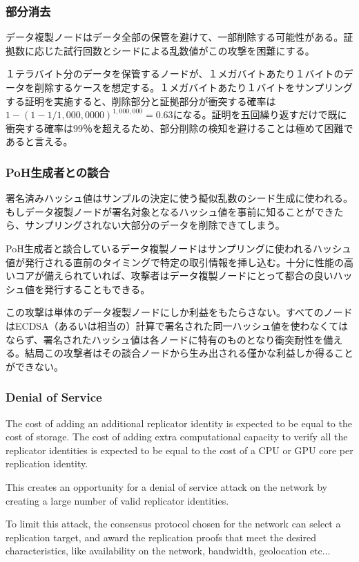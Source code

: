 \documentclass[12pt]{ltjsarticle}
\begin{document}
\subsubsection{部分消去}

データ複製ノードはデータ全部の保管を避けて、一部削除する可能性がある。証拠数に応じた試行回数とシードによる乱数値がこの攻撃を困難にする。

１テラバイト分のデータを保管するノードが、１メガバイトあたり１バイトのデータを削除するケースを想定する。１メガバイトあたり１バイトをサンプリングする証明を実施すると、削除部分と証拠部分が衝突する確率は\(1 - (1- 1/1,000,0000)^{1,000,000} = 0.63\)になる。証明を五回繰り返すだけで既に衝突する確率は99％を超えるため、部分削除の検知を避けることは極めて困難であると言える。

\subsubsection{PoH生成者との談合}

署名済みハッシュ値はサンプルの決定に使う擬似乱数のシード生成に使われる。もしデータ複製ノードが署名対象となるハッシュ値を事前に知ることができたら、サンプリングされない大部分のデータを削除できてしまう。

PoH生成者と談合しているデータ複製ノードはサンプリングに使われるハッシュ値が発行される直前のタイミングで特定の取引情報を挿し込む。十分に性能の高いコアが備えられていれば、攻撃者はデータ複製ノードにとって都合の良いハッシュ値を発行することもできる。

この攻撃は単体のデータ複製ノードにしか利益をもたらさない。すべてのノードはECDSA（あるいは相当の）計算で署名された同一ハッシュ値を使わなくてはならず、署名されたハッシュ値は各ノードに特有のものとなり衝突耐性を備える。結局この攻撃者はその談合ノードから生み出される僅かな利益しか得ることができない。

\subsubsection{Denial of Service}
The cost of adding an additional replicator identity is expected to be equal to the cost of storage. The cost of adding extra computational capacity to verify all the replicator identities is expected to be equal to the cost of a CPU or GPU core per replication identity.

This creates an opportunity for a denial of service attack on the network by creating a large number of valid replicator identities.

To limit this attack, the consensus protocol chosen for the network can select a replication target, and award the replication proofs that meet the desired characteristics, like availability on the network, bandwidth, geolocation etc...
\end{document}
